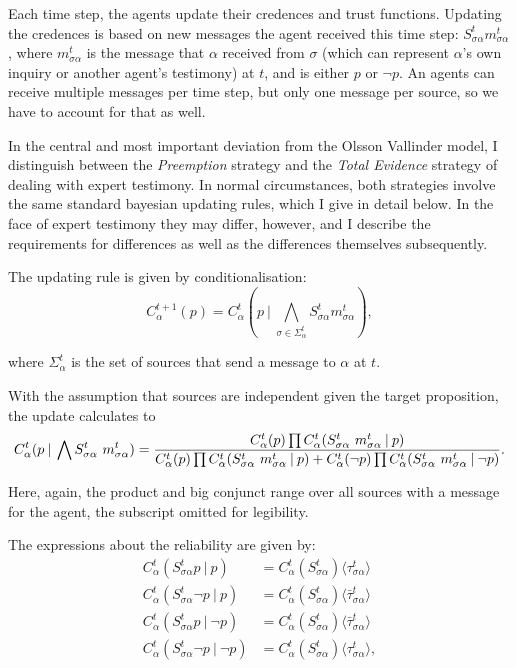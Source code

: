 \documentclass[11pt, a4paper]{scrartcl}
\newcommand{\Stsa}{S^t_{\sigma\alpha}}
\newcommand{\sa}{{\sigma\alpha}}
\newcommand{\given}[1][]{\:#1\vert\:}
\newcommand{\Sm}{\Stsa~m^t_{\sa}}
\renewcommand{\i}[1]{\emph{#1}}
\renewcommand{\a}{\alpha}
\begin{document}
Each time step, the agents update their credences and trust functions. Updating the credences is based on new messages the agent received this time step: $\Stsa m^t_{\sa}$, where $m^t_{\sa}$ is the message that $\alpha$ received from $\sigma$ (which can represent $\alpha$'s own inquiry or another agent's testimony) at $t$, and is either $p$ or $\neg p$. An agents can receive multiple messages per time step, but only one message per source, so we have to account for that as well. 

In the central and most important deviation from the Olsson Vallinder model, I distinguish between the \i{Preemption} strategy and the \i{Total Evidence} strategy of dealing with expert testimony. In normal circumstances, both strategies involve the same standard bayesian updating rules, which I give in detail below. In the face of expert testimony they may differ, however, and I describe the requirements for differences as well as the differences themselves subsequently. 

The updating rule is given by conditionalisation:
\[
    C^{t+1}_\alpha (p) = C^t_\alpha (p \given \bigwedge_{\sigma \in \Sigma^t_\alpha} \Stsa m^t_{\sa}),
\]

where $\Sigma^t_\alpha$ is the set of sources that send a message to $\alpha$ at $t$.

With the assumption that sources are independent given the target proposition, the update calculates to
\begin{equation}
    \label{eq:upd}
    C^t_\a (p \given \bigwedge \Sm) = \\
     \frac{C^t_\a (p) \prod C^t_\a (\Sm \given p) }
    {C^t_\a (p) \prod C^t_\a (\Sm \given p) +  C^t_\a (\neg p) \prod C^t_\a (\Sm \given \neg p) }.
\end{equation}

Here, again, the product and big conjunct range over all sources with a message for the agent, the subscript omitted for legibility.   

The expressions about the reliability are given by:
\begin{align*}
    C^t_\a (\Stsa p \given p) &= C^t_\a (\Stsa) \langle \tau^t_{\sa} \rangle \\
    C^t_\a (\Stsa \neg p \given p) &= C^t_\a (\Stsa) \langle \bar{\tau}^t_{\sa} \rangle \\
    C^t_\a (\Stsa p \given \neg p) &= C^t_\a (\Stsa) \langle \bar{\tau}^t_{\sa} \rangle \\
    C^t_\a (\Stsa \neg p \given \neg p) &= C^t_\a (\Stsa) \langle \tau^t_{\sa} \rangle,
\end{align*}
\end{document}
